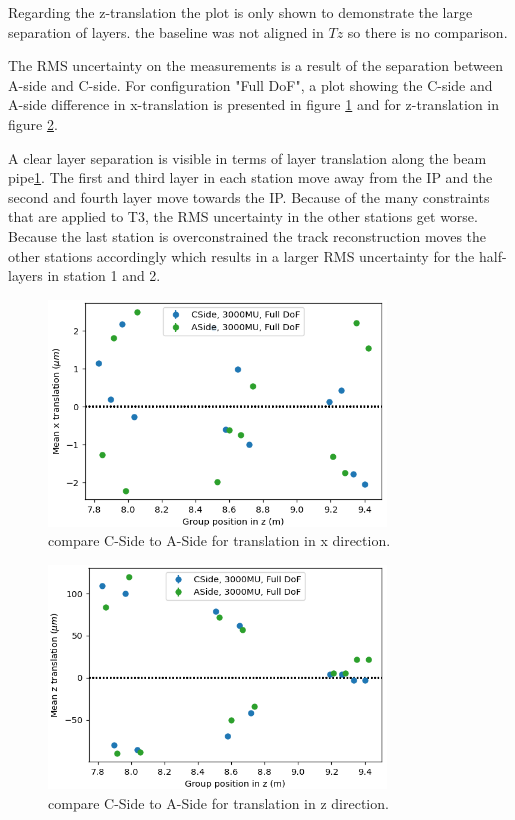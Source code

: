 Regarding the z-translation the plot is only shown to demonstrate the large separation of layers. the baseline was not aligned in $Tz$ so there is no comparison.

The RMS uncertainty on the measurements is a result of the separation between A-side and C-side. For configuration "Full DoF", a plot showing the C-side and A-side difference in x-translation is presented in figure \ref{fig:june_5} and for z-translation in figure \ref{fig:june_6}.

A clear layer separation is visible in terms of layer translation along the beam pipe\ref{fig:june_5}.
The first and third layer in each station move away from the IP and the second and
fourth layer move towards the IP.
Because of the many constraints that are applied to T3, the RMS uncertainty in the other stations get worse. Because the last station is overconstrained the track reconstruction moves the other stations accordingly which results in a larger RMS uncertainty for the half-layers in station 1 and 2.

\begin{figure}
  \centering
  \includegraphics[width=0.8\textwidth]{plots/renewed_plots/CA_allT_halfT3_Tx.png}
  \caption{compare C-Side to A-Side for translation in x direction.}
  \label{fig:june_5}
\end{figure}

\begin{figure}
  \centering
  \includegraphics[width=0.8\textwidth]{plots/renewed_plots/CA_allT_halfT3_Tz.png}
  \caption{compare C-Side to A-Side for translation in z direction.}
  \label{fig:june_6}
\end{figure}

